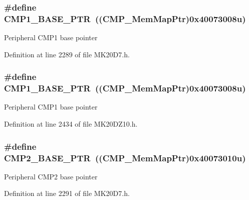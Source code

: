 \subsubsection[{\texorpdfstring{C\+M\+P1\+\_\+\+B\+A\+S\+E\+\_\+\+P\+TR}{CMP1_BASE_PTR}}]{\setlength{\rightskip}{0pt plus 5cm}\#define C\+M\+P1\+\_\+\+B\+A\+S\+E\+\_\+\+P\+TR~(({\bf C\+M\+P\+\_\+\+Mem\+Map\+Ptr})0x40073008u)}\hypertarget{group___c_m_p___peripheral_ga91e89d9d49a3f251dcd9026ad403a3e8}{}\label{group___c_m_p___peripheral_ga91e89d9d49a3f251dcd9026ad403a3e8}
Peripheral C\+M\+P1 base pointer 

Definition at line 2289 of file M\+K20\+D7.\+h.

\subsubsection[{\texorpdfstring{C\+M\+P1\+\_\+\+B\+A\+S\+E\+\_\+\+P\+TR}{CMP1_BASE_PTR}}]{\setlength{\rightskip}{0pt plus 5cm}\#define C\+M\+P1\+\_\+\+B\+A\+S\+E\+\_\+\+P\+TR~(({\bf C\+M\+P\+\_\+\+Mem\+Map\+Ptr})0x40073008u)}\hypertarget{group___c_m_p___peripheral_ga91e89d9d49a3f251dcd9026ad403a3e8}{}\label{group___c_m_p___peripheral_ga91e89d9d49a3f251dcd9026ad403a3e8}
Peripheral C\+M\+P1 base pointer 

Definition at line 2434 of file M\+K20\+D\+Z10.\+h.

\subsubsection[{\texorpdfstring{C\+M\+P2\+\_\+\+B\+A\+S\+E\+\_\+\+P\+TR}{CMP2_BASE_PTR}}]{\setlength{\rightskip}{0pt plus 5cm}\#define C\+M\+P2\+\_\+\+B\+A\+S\+E\+\_\+\+P\+TR~(({\bf C\+M\+P\+\_\+\+Mem\+Map\+Ptr})0x40073010u)}\hypertarget{group___c_m_p___peripheral_ga732cbf43f95d2d1cd01b4204263940ab}{}\label{group___c_m_p___peripheral_ga732cbf43f95d2d1cd01b4204263940ab}
Peripheral C\+M\+P2 base pointer 

Definition at line 2291 of file M\+K20\+D7.\+h.

